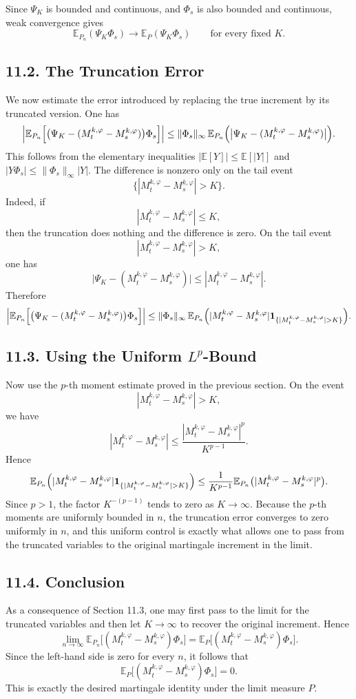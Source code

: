 \documentclass[11pt]{article}
\theoremstyle{definition}
\theoremstyle{remark}
\begin{document}
Since $\Psi_K$ is bounded and continuous, and $\Phi_s$ is also bounded and continuous, weak convergence gives
\[
  \mathbb E_{P_n}(\Psi_K\Phi_s)\to \mathbb E_P(\Psi_K\Phi_s)
  \qquad \text{for every fixed } K.
\]

\subsection*{11.2. The Truncation Error}
We now estimate the error introduced by replacing the true increment by its truncated version. One has
\[
  \left|
  \mathbb E_{P_n}\Bigl[\bigl(\Psi_K-(M_t^{k,\varphi}-M_s^{k,\varphi})\bigr)\Phi_s\Bigr]
  \right|
  \le
  \|\Phi_s\|_\infty\,
  \mathbb E_{P_n}\Bigl(
  \bigl|\Psi_K-(M_t^{k,\varphi}-M_s^{k,\varphi})\bigr|
  \Bigr).
\]
This follows from the elementary inequalities $|\mathbb E[Y]|\le \mathbb E[|Y|]$ and $|Y\Phi_s|\le \|\Phi_s\|_\infty |Y|$.
The difference is nonzero only on the tail event
\[
  \{|M_t^{k,\varphi}-M_s^{k,\varphi}|>K\}.
\]
Indeed, if
\[
  |M_t^{k,\varphi}-M_s^{k,\varphi}|\le K,
\]
then the truncation does nothing and the difference is zero. On the tail event
\[
  |M_t^{k,\varphi}-M_s^{k,\varphi}|>K,
\]
one has
\[
  \bigl|\Psi_K-(M_t^{k,\varphi}-M_s^{k,\varphi})\bigr|
  \le
  |M_t^{k,\varphi}-M_s^{k,\varphi}|.
\]
Therefore
\[
  \left|
  \mathbb E_{P_n}\Bigl[\bigl(\Psi_K-(M_t^{k,\varphi}-M_s^{k,\varphi})\bigr)\Phi_s\Bigr]
  \right|
  \le
  \|\Phi_s\|_\infty\,
  \mathbb E_{P_n}\Bigl(
  |M_t^{k,\varphi}-M_s^{k,\varphi}|
  \mathbf 1_{\{|M_t^{k,\varphi}-M_s^{k,\varphi}|>K\}}
  \Bigr).
\]

\subsection*{11.3. Using the Uniform $L^p$-Bound}
Now use the $p$-th moment estimate proved in the previous section. On the event
\[
  |M_t^{k,\varphi}-M_s^{k,\varphi}|>K,
\]
we have
\[
  |M_t^{k,\varphi}-M_s^{k,\varphi}|
  \le
  \frac{|M_t^{k,\varphi}-M_s^{k,\varphi}|^p}{K^{p-1}}.
\]
Hence
\[
  \mathbb E_{P_n}\Bigl(
  |M_t^{k,\varphi}-M_s^{k,\varphi}|
  \mathbf 1_{\{|M_t^{k,\varphi}-M_s^{k,\varphi}|>K\}}
  \Bigr)
  \le
  \frac{1}{K^{p-1}}
  \mathbb E_{P_n}\bigl(|M_t^{k,\varphi}-M_s^{k,\varphi}|^p\bigr).
\]
Since $p>1$, the factor $K^{-(p-1)}$ tends to zero as $K\to\infty$. Because the $p$-th moments are uniformly bounded in $n$, the truncation error converges to zero uniformly in $n$, and this uniform control is exactly what allows one to pass from the truncated variables to the original martingale increment in the limit.

\subsection*{11.4. Conclusion}
As a consequence of Section 11.3, one may first pass to the limit for the truncated variables and then let $K\to\infty$ to recover the original increment. Hence
\[
  \lim_{n\to\infty}
  \mathbb E_{P_n}\bigl[(M_t^{k,\varphi}-M_s^{k,\varphi})\Phi_s\bigr]
  =
  \mathbb E_P\bigl[(M_t^{k,\varphi}-M_s^{k,\varphi})\Phi_s\bigr].
\]
Since the left-hand side is zero for every $n$, it follows that
\[
  \mathbb E_P\bigl[(M_t^{k,\varphi}-M_s^{k,\varphi})\Phi_s\bigr]=0.
\]
This is exactly the desired martingale identity under the limit measure $P$.
\end{document}
